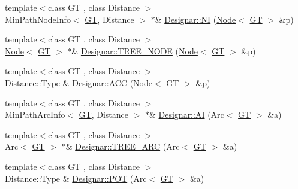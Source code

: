 \begin{DoxyCompactItemize}
\item 
{\footnotesize template$<$class GT , class Distance $>$ }\\Min\+Path\+Node\+Info$<$ \hyperlink{demo-buildgraph_8_c_a3001c40d2c31ca87ed96cd7d1334a55e}{GT}, Distance $>$ $\ast$\& \hyperlink{namespace_designar_aa80d7cfe1f0b0822f8e1bf21d4c9b5bf}{Designar\+::\+NI} (\hyperlink{test-mtreenode_8_c_a17a24b0725f59987143c5faf63c4dc6f}{Node}$<$ \hyperlink{demo-buildgraph_8_c_a3001c40d2c31ca87ed96cd7d1334a55e}{GT} $>$ \&p)
\item 
{\footnotesize template$<$class GT , class Distance $>$ }\\\hyperlink{test-mtreenode_8_c_a17a24b0725f59987143c5faf63c4dc6f}{Node}$<$ \hyperlink{demo-buildgraph_8_c_a3001c40d2c31ca87ed96cd7d1334a55e}{GT} $>$ $\ast$\& \hyperlink{namespace_designar_ac7b45bbd86a9f8ba44128fa5b61764fa}{Designar\+::\+T\+R\+E\+E\+\_\+\+N\+O\+DE} (\hyperlink{test-mtreenode_8_c_a17a24b0725f59987143c5faf63c4dc6f}{Node}$<$ \hyperlink{demo-buildgraph_8_c_a3001c40d2c31ca87ed96cd7d1334a55e}{GT} $>$ \&p)
\item 
{\footnotesize template$<$class GT , class Distance $>$ }\\Distance\+::\+Type \& \hyperlink{namespace_designar_a2fa5040a7e48c214be9eaf7df3a8ce1b}{Designar\+::\+A\+CC} (\hyperlink{test-mtreenode_8_c_a17a24b0725f59987143c5faf63c4dc6f}{Node}$<$ \hyperlink{demo-buildgraph_8_c_a3001c40d2c31ca87ed96cd7d1334a55e}{GT} $>$ \&p)
\item 
{\footnotesize template$<$class GT , class Distance $>$ }\\Min\+Path\+Arc\+Info$<$ \hyperlink{demo-buildgraph_8_c_a3001c40d2c31ca87ed96cd7d1334a55e}{GT}, Distance $>$ $\ast$\& \hyperlink{namespace_designar_a34a01d7c7eb615d616c2077f3b5473ea}{Designar\+::\+AI} (Arc$<$ \hyperlink{demo-buildgraph_8_c_a3001c40d2c31ca87ed96cd7d1334a55e}{GT} $>$ \&a)
\item 
{\footnotesize template$<$class GT , class Distance $>$ }\\Arc$<$ \hyperlink{demo-buildgraph_8_c_a3001c40d2c31ca87ed96cd7d1334a55e}{GT} $>$ $\ast$\& \hyperlink{namespace_designar_a3a95ec02db0863fee6d0a384f502754b}{Designar\+::\+T\+R\+E\+E\+\_\+\+A\+RC} (Arc$<$ \hyperlink{demo-buildgraph_8_c_a3001c40d2c31ca87ed96cd7d1334a55e}{GT} $>$ \&a)
\item 
{\footnotesize template$<$class GT , class Distance $>$ }\\Distance\+::\+Type \& \hyperlink{namespace_designar_afa0b0cf6848e8b604d27c630db119b29}{Designar\+::\+P\+OT} (Arc$<$ \hyperlink{demo-buildgraph_8_c_a3001c40d2c31ca87ed96cd7d1334a55e}{GT} $>$ \&a)

\end{DoxyCompactItemize}
